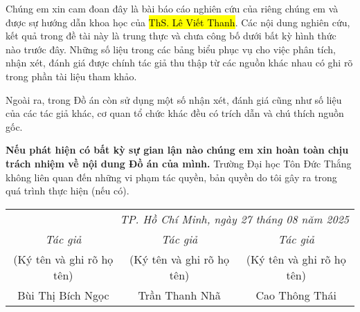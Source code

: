 
\begin{center}
\par\vspace{0.25em}
\end{center}

Chúng em xin cam đoan đây là bài báo cáo nghiên cứu của riêng chúng em
và được sự hướng dẫn khoa học của \hl{ThS. Lê Viết Thanh}. Các nội dung nghiên cứu, kết quả trong đề tài này là trung thực và chưa công bố dưới bất kỳ hình thức 
nào trước đây. Những số liệu trong các bảng biểu phục vụ cho việc phân tích, nhận xét, đánh giá được chính tác giả thu thập từ các nguồn khác nhau có ghi rõ trong phần tài liệu tham khảo.

Ngoài ra, trong Đồ án còn sử dụng một số nhận xét, đánh giá cũng như số liệu của các tác giả khác, cơ quan tổ chức khác đều có trích dẫn và chú thích nguồn gốc. 

\textbf{Nếu phát hiện có bất kỳ sự gian lận nào chúng em xin hoàn toàn chịu trách nhiệm về nội dung Đồ án của mình.} Trường Đại học Tôn Đức Thắng không liên quan đến những vi phạm tác quyền, bản quyền do tôi gây ra trong quá trình thực hiện (nếu có).


\vspace{1cm} %

\begin{flushright}
\begin{tabular}{ccc}
    \multicolumn{3}{r}{\textit{TP. Hồ Chí Minh, ngày 27 tháng 08 năm 2025}} \\
    \noalign{\vspace{0.5cm}} %
    \textit{Tác giả} & \textit{Tác giả} & \textit{Tác giả} \\
    (Ký tên và ghi rõ họ tên) & (Ký tên và ghi rõ họ tên) & (Ký tên và ghi rõ họ tên) \\
    \noalign{\vspace{2cm}}
    Bùi Thị Bích Ngọc & Trần Thanh Nhã & Cao Thông Thái \\
\end{tabular}
\end{flushright}